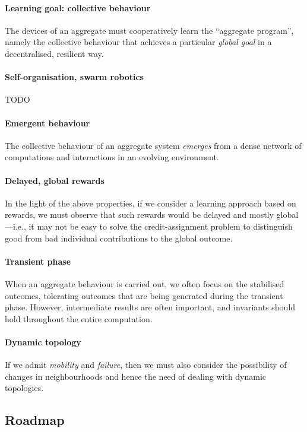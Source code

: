 \documentclass[
twocolumn,
]{ceurart}
\newcommand{\meta}[1]{{\color{blue}#1}}
\begin{document}
\paragraph{Learning goal: collective behaviour}
%
The devices of an aggregate 
 must cooperatively learn the ``aggregate program'',
 namely the collective behaviour 
 that achieves a particular \emph{global goal}
 in a decentralised, resilient way.
%

\paragraph{Self-organisation, swarm robotics}
%
\meta{TODO}

\paragraph{Emergent behaviour}
%
The collective behaviour of an aggregate system
 \emph{emerges} 
 from a dense network of computations and interactions
 in an evolving environment.
%

\paragraph{Delayed, global rewards}
%
In the light of the above properties,
 if we consider a learning approach based on rewards,
 we must observe that such rewards would be
 delayed and mostly global---i.e.,
 it may not be easy to solve the credit-assignment problem
 to distinguish good from bad individual contributions
 to the global outcome.

\paragraph{Transient phase}
%
When an aggregate behaviour is carried out,
 we often focus on the stabilised outcomes,
 tolerating outcomes that are being generated
 during the transient phase.
%
However, intermediate results are often important,
 and invariants should hold throughout the entire computation.

\paragraph{Dynamic topology}
%
If we admit \emph{mobility} and \emph{failure},
 then we must also consider 
 the possibility of changes in neighbourhoods
 and hence the need of dealing with dynamic topologies.


\subsection{Roadmap}
\end{document}
